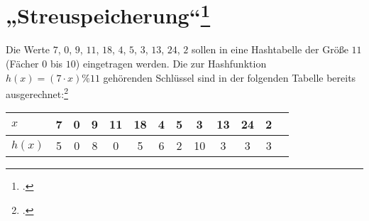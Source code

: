 \documentclass{lehramt-informatik}
\begin{document}
%

\section{„Streuspeicherung“\footcite[Aufgabe 4: „Streuspeicherung
“]{examen:46115:2013:03}}

Die Werte $7$, $0$, $9$, $11$, $18$, $4$, $5$, $3$, $13$, $24$, $2$
sollen in eine Hashtabelle der Größe $11$ (Fächer $0$ bis $10$)
eingetragen werden. Die zur Hashfunktion $h(x) = (7 \cdot x) \% 11$
gehörenden Schlüssel sind in der folgenden Tabelle bereits
ausgerechnet:\footcite[Seite 2]{aud:pu:5}

\begin{center}
\begin{tabular}{|l|c|c|c|c|c|c|c|c|c|c|c|c|}
\hline
$x$ & 7 & 0 & 9 & 11 & 18 & 4 & 5 & 3 & 13 & 24 & 2\\\hline
$h(x)$ & 5 & 0 & 8 & 0 & 5 & 6 & 2 & 10 & 3 & 3 & 3\\\hline
\end{tabular}
\end{center}
\end{document}
